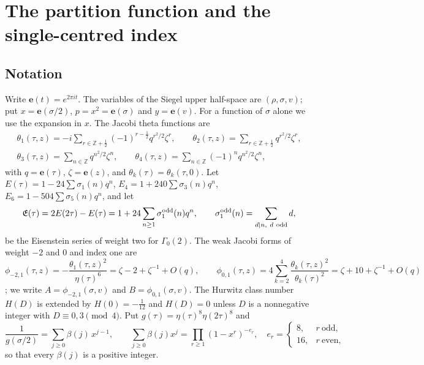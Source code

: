 \documentclass[11pt]{amsart}
\theoremstyle{definition}
\newcommand{\ZZ}{\mathbb{Z}}
\newcommand{\fE}{\mathfrak E}
\newcommand{\pA}{\phi_{-2,1}}
\newcommand{\pB}{\phi_{0,1}}
\newcommand{\e}{\mathbf e}
\begin{document}


\section{The partition function and the single-centred index}\label{sec:setup}

\subsection{Notation}
Write $\e(t)=e^{2\pi it}$. The variables of the Siegel upper half-space are $(\rho,\sigma,v)$; put $x=\e(\sigma/2)$, $p=x^2=\e(\sigma)$ and $y=\e(v)$. For a function of $\sigma$ alone we use the expansion in $x$. The Jacobi theta functions are
\[
\begin{gathered}
\theta_1(\tau,z)=-i\!\!\sum_{r\in\ZZ+\frac12}\!\!(-1)^{r-\frac12}q^{r^2/2}\zeta^r,\qquad
\theta_2(\tau,z)=\!\!\sum_{r\in\ZZ+\frac12}\!\!q^{r^2/2}\zeta^r,\\
\theta_3(\tau,z)=\sum_{n\in\ZZ}q^{n^2/2}\zeta^n,\qquad
\theta_4(\tau,z)=\sum_{n\in\ZZ}(-1)^nq^{n^2/2}\zeta^n,
\end{gathered}
\]
with $q=\e(\tau)$, $\zeta=\e(z)$, and $\theta_k(\tau)=\theta_k(\tau,0)$. Let $E(\tau)=1-24\sum\sigma_1(n)q^n$, $E_4=1+240\sum\sigma_3(n)q^n$, $E_6=1-504\sum\sigma_5(n)q^n$, and let
\[
\fE(\tau)=2E(2\tau)-E(\tau)=1+24\sum_{n\ge1}\sigma_1^{\rm odd}(n)q^n,\qquad \sigma_1^{\rm odd}(n)=\sum_{d\mid n,\ d\ \text{odd}}d,
\]
be the Eisenstein series of weight two for $\Gamma_0(2)$. The weak Jacobi forms of weight $-2$ and $0$ and index one are
\[
\pA(\tau,z)=-\frac{\theta_1(\tau,z)^2}{\eta(\tau)^6}=\zeta-2+\zeta^{-1}+O(q),\qquad \pB(\tau,z)=4\sum_{k=2}^4\frac{\theta_k(\tau,z)^2}{\theta_k(\tau)^2}=\zeta+10+\zeta^{-1}+O(q)\!
\]
\cite[\S9]{EZ85}; we write $A=\pA(\sigma,v)$ and $B=\pB(\sigma,v)$. The Hurwitz class number $H(D)$ is extended by $H(0)=-\frac1{12}$ and $H(D)=0$ unless $D$ is a nonnegative integer with $D\equiv0,3\pmod 4$. Put $g(\tau)=\eta(\tau)^8\eta(2\tau)^8$ and
\begin{equation}\label{eq:beta}
\frac1{g(\sigma/2)}=\sum_{j\ge0}\beta(j)\,x^{j-1},\qquad \sum_{j\ge0}\beta(j)x^j=\prod_{r\ge1}(1-x^r)^{-e_r},\quad e_r=\begin{cases}8,&r\ \text{odd},\\16,&r\ \text{even},\end{cases}
\end{equation}
so that every $\beta(j)$ is a positive integer.
\end{document}
